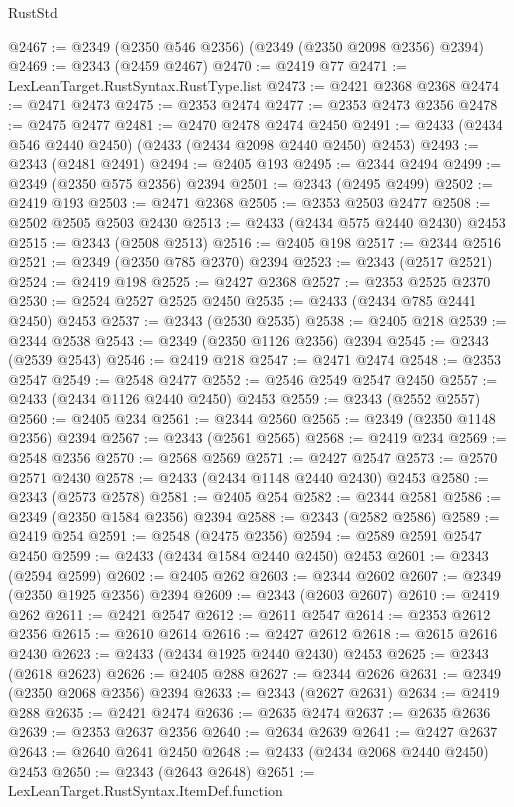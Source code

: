 \begin{lexlean}{RustStd}
\begin{coremodule}
@2467 := @2349 (@2350 @546 @2356) (@2349 (@2350 @2098 @2356) @2394)
@2469 := @2343 (@2459 @2467)
@2470 := @2419 @77
@2471 := LexLeanTarget.RustSyntax.RustType.list
@2473 := @2421 @2368 @2368
@2474 := @2471 @2473
@2475 := @2353 @2474
@2477 := @2353 @2473 @2356
@2478 := @2475 @2477
@2481 := @2470 @2478 @2474 @2450
@2491 := @2433 (@2434 @546 @2440 @2450) (@2433 (@2434 @2098 @2440 @2450) @2453)
@2493 := @2343 (@2481 @2491)
@2494 := @2405 @193
@2495 := @2344 @2494
@2499 := @2349 (@2350 @575 @2356) @2394
@2501 := @2343 (@2495 @2499)
@2502 := @2419 @193
@2503 := @2471 @2368
@2505 := @2353 @2503 @2477
@2508 := @2502 @2505 @2503 @2430
@2513 := @2433 (@2434 @575 @2440 @2430) @2453
@2515 := @2343 (@2508 @2513)
@2516 := @2405 @198
@2517 := @2344 @2516
@2521 := @2349 (@2350 @785 @2370) @2394
@2523 := @2343 (@2517 @2521)
@2524 := @2419 @198
@2525 := @2427 @2368
@2527 := @2353 @2525 @2370
@2530 := @2524 @2527 @2525 @2450
@2535 := @2433 (@2434 @785 @2441 @2450) @2453
@2537 := @2343 (@2530 @2535)
@2538 := @2405 @218
@2539 := @2344 @2538
@2543 := @2349 (@2350 @1126 @2356) @2394
@2545 := @2343 (@2539 @2543)
@2546 := @2419 @218
@2547 := @2471 @2474
@2548 := @2353 @2547
@2549 := @2548 @2477
@2552 := @2546 @2549 @2547 @2450
@2557 := @2433 (@2434 @1126 @2440 @2450) @2453
@2559 := @2343 (@2552 @2557)
@2560 := @2405 @234
@2561 := @2344 @2560
@2565 := @2349 (@2350 @1148 @2356) @2394
@2567 := @2343 (@2561 @2565)
@2568 := @2419 @234
@2569 := @2548 @2356
@2570 := @2568 @2569
@2571 := @2427 @2547
@2573 := @2570 @2571 @2430
@2578 := @2433 (@2434 @1148 @2440 @2430) @2453
@2580 := @2343 (@2573 @2578)
@2581 := @2405 @254
@2582 := @2344 @2581
@2586 := @2349 (@2350 @1584 @2356) @2394
@2588 := @2343 (@2582 @2586)
@2589 := @2419 @254
@2591 := @2548 (@2475 @2356)
@2594 := @2589 @2591 @2547 @2450
@2599 := @2433 (@2434 @1584 @2440 @2450) @2453
@2601 := @2343 (@2594 @2599)
@2602 := @2405 @262
@2603 := @2344 @2602
@2607 := @2349 (@2350 @1925 @2356) @2394
@2609 := @2343 (@2603 @2607)
@2610 := @2419 @262
@2611 := @2421 @2547
@2612 := @2611 @2547
@2614 := @2353 @2612 @2356
@2615 := @2610 @2614
@2616 := @2427 @2612
@2618 := @2615 @2616 @2430
@2623 := @2433 (@2434 @1925 @2440 @2430) @2453
@2625 := @2343 (@2618 @2623)
@2626 := @2405 @288
@2627 := @2344 @2626
@2631 := @2349 (@2350 @2068 @2356) @2394
@2633 := @2343 (@2627 @2631)
@2634 := @2419 @288
@2635 := @2421 @2474
@2636 := @2635 @2474
@2637 := @2635 @2636
@2639 := @2353 @2637 @2356
@2640 := @2634 @2639
@2641 := @2427 @2637
@2643 := @2640 @2641 @2450
@2648 := @2433 (@2434 @2068 @2440 @2450) @2453
@2650 := @2343 (@2643 @2648)
@2651 := LexLeanTarget.RustSyntax.ItemDef.function

\end{coremodule}
\end{lexlean}
